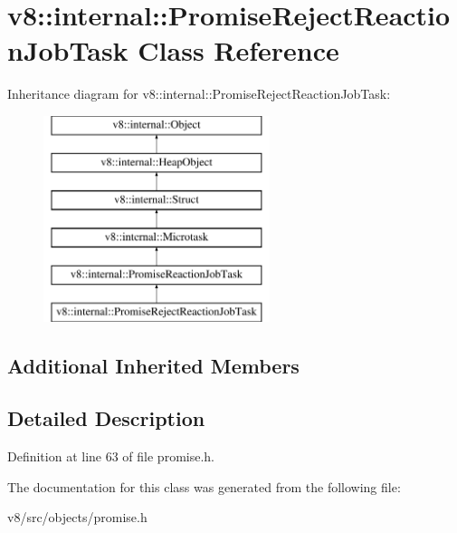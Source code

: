\hypertarget{classv8_1_1internal_1_1PromiseRejectReactionJobTask}{}\section{v8\+:\+:internal\+:\+:Promise\+Reject\+Reaction\+Job\+Task Class Reference}
\label{classv8_1_1internal_1_1PromiseRejectReactionJobTask}
Inheritance diagram for v8\+:\+:internal\+:\+:Promise\+Reject\+Reaction\+Job\+Task\+:\begin{figure}[H]
\begin{center}
\leavevmode
\includegraphics[height=6.000000cm]{classv8_1_1internal_1_1PromiseRejectReactionJobTask}
\end{center}
\end{figure}
\subsection*{Additional Inherited Members}


\subsection{Detailed Description}


Definition at line 63 of file promise.\+h.



The documentation for this class was generated from the following file\+:\begin{DoxyCompactItemize}
\item 
v8/src/objects/promise.\+h\end{DoxyCompactItemize}

